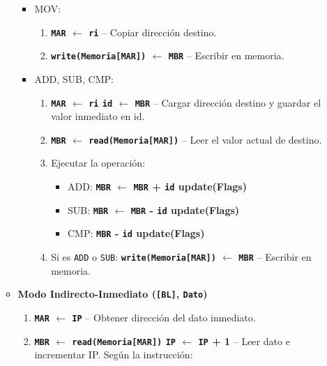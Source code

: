 \documentclass[12pt,oneside]{templates/unerthesis}
\providecommand{\tightlist}{%
  \setlength{\itemsep}{0pt}\setlength{\parskip}{0pt}}
\begin{document}
\begin{itemize}
\begin{itemize}
    \begin{itemize}
    \tightlist
    \item
      MOV:

      \begin{enumerate}
      \def\labelenumi{\arabic{enumi}.}
      \setcounter{enumi}{7}
      \tightlist
      \item
        \textbf{\texttt{MAR} \(\leftarrow\) \texttt{ri}} -- Copiar dirección destino.
      \item
        \textbf{\texttt{write(Memoria{[}MAR{]})} \(\leftarrow\) \texttt{MBR}} -- Escribir en memoria.
      \end{enumerate}
    \item
      ADD, SUB, CMP:

      \begin{enumerate}
      \def\labelenumi{\arabic{enumi}.}
      \setcounter{enumi}{7}
      \tightlist
      \item
        \textbf{\texttt{MAR} \(\leftarrow\) \texttt{ri} \textbar{} \texttt{id} \(\leftarrow\) \texttt{MBR}} -- Cargar dirección destino y guardar el valor inmediato en id.
      \item
        \textbf{\texttt{MBR} \(\leftarrow\) \texttt{read(Memoria{[}MAR{]})}} -- Leer el valor actual de destino.
      \item
        Ejecutar la operación:

        \begin{itemize}
        \tightlist
        \item
          ADD: \textbf{\texttt{MBR} \(\leftarrow\) \texttt{MBR} + \texttt{id} \textbar{} update(Flags)}
        \item
          SUB: \textbf{\texttt{MBR} \(\leftarrow\) \texttt{MBR} - \texttt{id} \textbar{} update(Flags)}
        \item
          CMP: \textbf{\texttt{MBR} - \texttt{id} \textbar{} update(Flags)}
        \end{itemize}
      \item
        Si es \texttt{ADD} o \texttt{SUB}: \textbf{\texttt{write(Memoria{[}MAR{]})} \(\leftarrow\) \texttt{MBR}} -- Escribir en memoria.
      \end{enumerate}
    \end{itemize}
  \item
    \textbf{Modo Indirecto-Inmediato (\texttt{{[}BL{]}}, \texttt{Dato})}

    \begin{enumerate}
    \def\labelenumi{\arabic{enumi}.}
    \setcounter{enumi}{3}
    \tightlist
    \item
      \textbf{\texttt{MAR} \(\leftarrow\) \texttt{IP}} -- Obtener dirección del dato inmediato.
    \item
      \textbf{\texttt{MBR} \(\leftarrow\) \texttt{read(Memoria{[}MAR{]})} \textbar{} \texttt{IP} \(\leftarrow\) \texttt{IP} + 1} -- Leer dato e incrementar IP.
      Según la instrucción:
    \end{enumerate}


\end{itemize}
\end{itemize}
\end{document}
